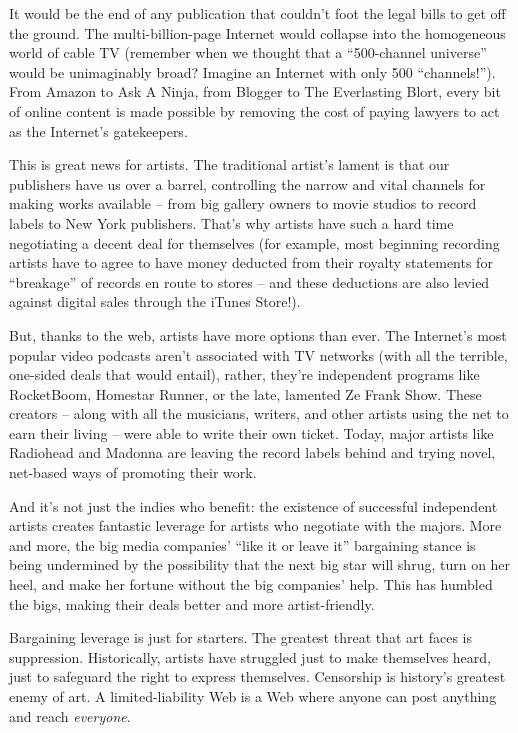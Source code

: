 It would be the end of any publication that couldn't foot the legal
bills to get off the ground. The multi-billion-page Internet would
collapse into the homogeneous world of cable TV (remember when we
thought that a ``500-channel universe'' would be unimaginably broad?
Imagine an Internet with only 500 ``channels!''). From Amazon to Ask
A Ninja, from Blogger to The Everlasting Blort, every bit of online
content is made possible by removing the cost of paying lawyers to
act as the Internet's gatekeepers.

This is great news for artists. The traditional artist's lament is
that our publishers have us over a barrel, controlling the narrow
and vital channels for making works available -- from big gallery
owners to movie studios to record labels to New York publishers.
That's why artists have such a hard time negotiating a decent deal
for themselves (for example, most beginning recording artists have
to agree to have money deducted from their royalty statements for
``breakage'' of records en route to stores -- and these deductions
are also levied against digital sales through the iTunes Store!).

But, thanks to the web, artists have more options than ever. The
Internet's most popular video podcasts aren't associated with TV
networks (with all the terrible, one-sided deals that would
entail), rather, they're independent programs like RocketBoom,
Homestar Runner, or the late, lamented Ze Frank Show. These
creators -- along with all the musicians, writers, and other
artists using the net to earn their living -- were able to write
their own ticket. Today, major artists like Radiohead and Madonna
are leaving the record labels behind and trying novel, net-based
ways of promoting their work.

And it's not just the indies who benefit: the existence of
successful independent artists creates fantastic leverage for
artists who negotiate with the majors. More and more, the big media
companies' ``like it or leave it'' bargaining stance is being
undermined by the possibility that the next big star will shrug,
turn on her heel, and make her fortune without the big companies'
help. This has humbled the bigs, making their deals better and more
artist-friendly.

Bargaining leverage is just for starters. The greatest threat that
art faces is suppression. Historically, artists have struggled just
to make themselves heard, just to safeguard the right to express
themselves. Censorship is history's greatest enemy of art. A
limited-liability Web is a Web where anyone can post anything and
reach \emph{everyone}.

